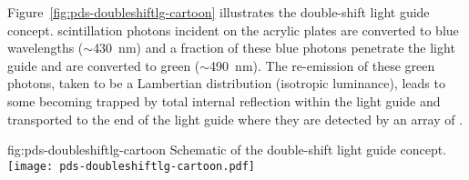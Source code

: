 Figure~\ref{fig:pds-doubleshiftlg-cartoon} illustrates the double-shift light guide concept.  scintillation photons incident on the acrylic plates are converted to blue wavelengths ($\sim$\SI{430}{nm}) and a fraction of these blue photons penetrate the light guide and are converted to green ($\sim$\SI{490}{nm}). The re-emission of these green photons, taken to be a Lambertian distribution (isotropic luminance), leads to some becoming trapped by total internal reflection within the light guide and  transported to the end of the light guide where they are detected by an array of .

\begin{dunefigure}{fig:pds-doubleshiftlg-cartoon}
{Schematic of the double-shift light guide concept.}
  \texttt{[image: pds-doubleshiftlg-cartoon.pdf]}
\end{dunefigure}


%


